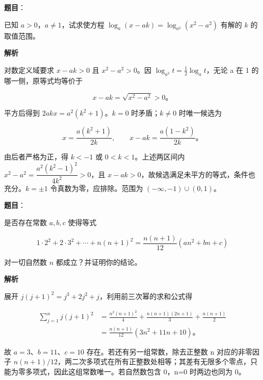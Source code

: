 \begin{answer}

\textbf{题目}：

已知 $a>0$，$a\ne1$，试求使方程 $\log_a(x-ak)=\log_{a^2}(x^2-a^2)$ 有解的 $k$ 的取值范围。

\textbf{解析}

对数定义域要求 $x-ak>0$ 且 $x^2-a^2>0$。因 $\log_{a^2}t=\tfrac12\log_at$，无论 a 在 1 的哪一侧，原等式均等价于

\nopagebreak[4]
\[
x-ak=\sqrt{x^2-a^2}>0\text{。}
\]

平方后得到 $2akx=a^2(k^2+1)$。$k=0$ 时矛盾；$k\ne0$ 时唯一候选为

\nopagebreak[4]
\[
x=\frac{a(k^2+1)}{2k},\qquad x-ak=\frac{a(1-k^2)}{2k}\text{。}
\]

由后者严格为正，得 $k<-1$ 或 $0<k<1$。上述两区间内 $x^2-a^2=\dfrac{a^2(k^2-1)^2}{4k^2}>0$，且 $x-ak>0$，故候选满足未平方的等式，条件也充分。$k=\pm1$ 令真数为零，应排除。范围为 $(-\infty,-1)\cup(0,1)$。


\end{answer}
\begin{answer}

\textbf{题目}：

是否存在常数 $a,b,c$ 使得等式

\nopagebreak[4]
\[
1\cdot2^2+2\cdot3^2+\cdots+n(n+1)^2
=\frac{n(n+1)}{12}(an^2+bn+c)
\]

对一切自然数 $n$ 都成立？并证明你的结论。

\textbf{解析}

展开 $j(j+1)^2=j^3+2j^2+j$，利用前三次幂的求和公式得

\nopagebreak[4]
\[
\begin{aligned}
\sum_{j=1}^n j(j+1)^2
&=\frac{n^2(n+1)^2}{4}
+\frac{n(n+1)(2n+1)}{3}
+\frac{n(n+1)}2\\
&=\frac{n(n+1)}{12}(3n^2+11n+10)\text{。}
\end{aligned}
\]

故 $a=3$、$b=11$、$c=10$ 存在。若还有另一组常数，除去正整数 n 对应的非零因子 $n(n+1)/12$，两二次多项式在所有正整数处相等；其差有无限多个零点，只能为零多项式，因此这组常数唯一。若自然数包含 0，n=0 时两边也同为 0。


\end{answer}
